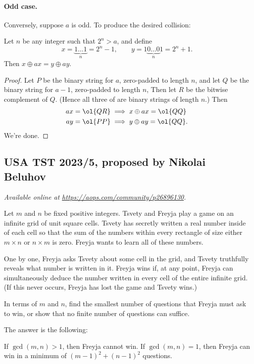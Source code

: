 \documentclass[11pt]{scrartcl}
\begin{document}
\paragraph{Odd case.}
Conversely, suppose $a$ is odd.
To produce the desired collision:
\begin{claim*}
  Let $n$ be any integer such that $2^n > a$, and define
  \[ x = \underbrace{1\dots1}_n = 2^n-1,
  \qquad y = 1\underbrace{0\dots0}_n1 = 2^n+1. \]
  Then $x \oplus ax = y \oplus ay$.
\end{claim*}
\begin{proof}
  Let $P$ be the binary string for $a$, zero-padded to length $n$,
  and let $Q$ be the binary string for $a - 1$, zero-padded to length $n$,
  Then let $R$ be the bitwise complement of $Q$.
  (Hence all three of are binary strings of length $n$.)
  Then
  \begin{align*}
    ax = \ol{QR} &\implies x \oplus ax = \ol{QQ} \\
    ay = \ol{PP} &\implies y \oplus ay = \ol{QQ}.
  \end{align*}
  We're done.
\end{proof}
\pagebreak

\subsection{USA TST 2023/5, proposed by Nikolai Beluhov}
\textsl{Available online at \url{https://aops.com/community/p26896130}.}
\begin{mdframed}[style=mdpurplebox,frametitle={Problem statement}]
Let $m$ and $n$ be fixed positive integers.
Tsvety and Freyja play a game on an infinite grid of unit square cells.
Tsvety has secretly written a real number inside of each cell so that
the sum of the numbers within every rectangle of size
either $m \times n$ or $n \times m$ is zero.
Freyja wants to learn all of these numbers.

One by one, Freyja asks Tsvety about some cell in the grid,
and Tsvety truthfully reveals what number is written in it.
Freyja wins if, at any point, Freyja can simultaneously deduce
the number written in every cell of the entire infinite grid.
(If this never occurs, Freyja has lost the game and Tsvety wins.)

In terms of $m$ and $n$, find the smallest number of
questions that Freyja must ask to win,
or show that no finite number of questions can suffice.
\end{mdframed}
The answer is the following:
\begin{itemize}
  \ii If $\gcd(m, n) > 1$, then Freyja cannot win.
  \ii If $\gcd(m, n) = 1$, then Freyja
  can win in a minimum of $(m-1)^2 + (n-1)^2$ questions.
\end{itemize}
\end{document}
